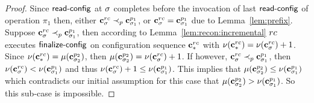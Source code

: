 \begin{proof}
  Since $\act{read-config}$ at $\sigma$ completes before the invocation of last $\act{read-config}$ of operation  $\pi_1$ then, either
   $\mathbf{c}^{rc}_{\sigma}  \prec_p \mathbf{c}^{p_1}_{\sigma_1}$, or $\mathbf{c}^{rc}_{\sigma}  = \mathbf{c}^{p_1}_{\sigma_1}$ due to Lemma~\ref{lem:prefix}.  
  Suppose  $\mathbf{c}^{rc}_{\sigma}  \prec_p \mathbf{c}^{p_1}_{\sigma_1}$,  then according to Lemma~\ref{lem:recon:incremental} $rc$  executes $\act{finalize-config}$  on configuration sequence  $\mathbf{c}^{rc}_{*}$ with  $\nu(\mathbf{c}^{rc}_{*}) = \nu(\mathbf{c}^{rc}_{\sigma}) + 1$. 
  Since $\nu(\mathbf{c}^{rc}_{*}) = \mu(\mathbf{c}^{p_2}_{\sigma_2})$, then
  $\mu(\mathbf{c}^{p_2}_{\sigma_2}) = \nu(\mathbf{c}^{rc}_{\sigma}) + 1$. 
  If however, $\mathbf{c}^{rc}_{\sigma}  \prec_p \mathbf{c}^{p_1}_{\sigma_1}$, then 
  $\nu(\mathbf{c}^{rc}_{\sigma}) < \nu(\mathbf{c}^{p_1}_{\sigma_1})$ and thus 
  $\nu(\mathbf{c}^{rc}_{\sigma})+1 \leq \nu(\mathbf{c}^{p_1}_{\sigma_1})$. 
  This implies that
      $\mu(\mathbf{c}^{p_2}_{\sigma_2})  \leq  \nu(\mathbf{c}^{p_1}_{\sigma_1})$  which 
      contradicts our initial assumption for this case that $\mu(\mathbf{c}^{p_2}_{\sigma_2}) >  \nu(\mathbf{c}^{p_1}_{\sigma_1})$. So this sub-case is impossible.


\end{proof}

